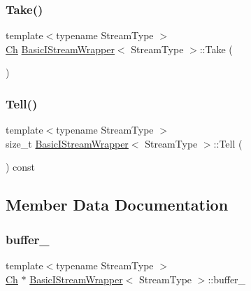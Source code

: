 \mbox{\label{classBasicIStreamWrapper_afb71f0329d0abbbc9b22ebeb5c1464d1}} 
\subsubsection{\texorpdfstring{Take()}{Take()}}
{\footnotesize\ttfamily template$<$typename Stream\+Type $>$ \\
\hyperlink{classBasicIStreamWrapper_a88e4288ecdaa0d31ddf4e5917b9aa8d7}{Ch} \hyperlink{classBasicIStreamWrapper}{Basic\+I\+Stream\+Wrapper}$<$ Stream\+Type $>$\+::Take (\begin{DoxyParamCaption}{ }\end{DoxyParamCaption})\hspace{0.3cm}{\ttfamily [inline]}}

\mbox{\label{classBasicIStreamWrapper_ac212848265f937add49bd973de794e25}} 
\subsubsection{\texorpdfstring{Tell()}{Tell()}}
{\footnotesize\ttfamily template$<$typename Stream\+Type $>$ \\
size\+\_\+t \hyperlink{classBasicIStreamWrapper}{Basic\+I\+Stream\+Wrapper}$<$ Stream\+Type $>$\+::Tell (\begin{DoxyParamCaption}{ }\end{DoxyParamCaption}) const\hspace{0.3cm}{\ttfamily [inline]}}



\subsection{Member Data Documentation}
\mbox{\label{classBasicIStreamWrapper_afcec6ce42add3ff03bbc8f48b1684234}} 
\subsubsection{\texorpdfstring{buffer\+\_\+}{buffer\_}}
{\footnotesize\ttfamily template$<$typename Stream\+Type $>$ \\
\hyperlink{classBasicIStreamWrapper_a88e4288ecdaa0d31ddf4e5917b9aa8d7}{Ch} $\ast$ \hyperlink{classBasicIStreamWrapper}{Basic\+I\+Stream\+Wrapper}$<$ Stream\+Type $>$\+::buffer\+\_\+\hspace{0.3cm}{\ttfamily [private]}}

